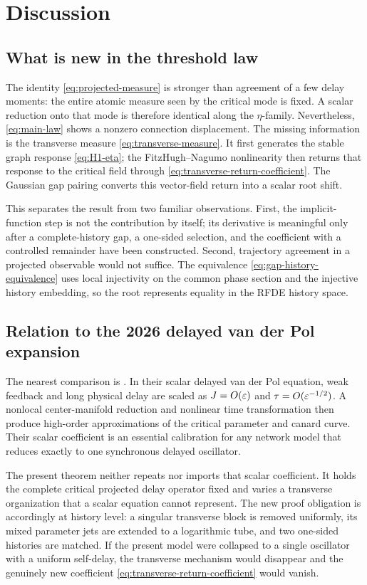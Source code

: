 \section{Discussion}
\label{sec:discussion}

\subsection{What is new in the threshold law}

The identity \cref{eq:projected-measure} is stronger than agreement of a
few delay moments: the entire atomic measure seen by the critical mode is
fixed.  A scalar reduction onto that mode is therefore identical along the
\(\eta\)-family.  Nevertheless, \cref{eq:main-law} shows a nonzero
connection displacement.  The missing information is the transverse
measure \cref{eq:transverse-measure}.  It first generates the stable graph
response \cref{eq:H1-eta}; the FitzHugh--Nagumo nonlinearity then returns
that response to the critical field through
\cref{eq:transverse-return-coefficient}.  The Gaussian gap pairing converts
this vector-field return into a scalar root shift.

This separates the result from two familiar observations.  First, the
implicit-function step is not the contribution by itself; its derivative
is meaningful only after a complete-history gap, a one-sided selection, and
the coefficient with a controlled remainder have been constructed.
Second, trajectory agreement in a projected observable would not suffice.
The equivalence \cref{eq:gap-history-equivalence} uses local injectivity on
the common phase section and the injective history embedding, so the root
represents equality in the RFDE history space.

\subsection{Relation to the 2026 delayed van der Pol expansion}

The nearest comparison is \citet{zhang2026high}.  In their scalar delayed
van der Pol equation, weak feedback and long physical delay are scaled as
\(J=O(\varepsilon)\) and \(\tau=O(\varepsilon^{-1/2})\).  A nonlocal center-manifold
reduction and nonlinear time transformation then produce high-order
approximations of the critical parameter and canard curve.  Their scalar
coefficient is an essential calibration for any network model that reduces
exactly to one synchronous delayed oscillator.

The present theorem neither repeats nor imports that scalar coefficient.
It holds the complete critical projected delay operator fixed and varies a
transverse organization that a scalar equation cannot represent.  The new
proof obligation is accordingly at history level: a singular transverse
block is removed uniformly, its mixed parameter jets are extended to a
logarithmic tube, and two one-sided histories are matched.  If the present
model were collapsed to a single oscillator with a uniform self-delay, the
transverse mechanism would disappear and the genuinely new coefficient
\cref{eq:transverse-return-coefficient} would vanish.

